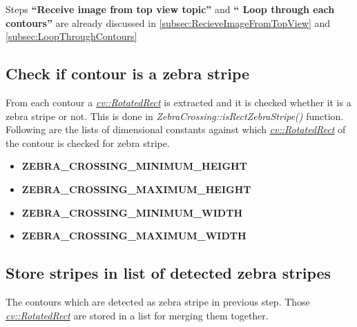 Steps \textbf{``Receive image from top view topic''} and \textbf{`` Loop through each contours''} are already discussed in \autoref{subsec:RecieveImageFromTopView} and \autoref{subsec:LoopThroughContours}

\subsection{Check if contour is a zebra stripe}
\label{sec:ZebraCrossingStripeChecking}
From each contour a \href{https://docs.opencv.org/3.4.3/db/dd6/classcv_1_1RotatedRect.html}{\emph{cv::RotatedRect}} is extracted and it is checked whether it is a zebra stripe or not. This is done in \emph{ZebraCrossing::isRectZebraStripe()} function. Following are the lists of dimensional constants against which \href{https://docs.opencv.org/3.4.3/db/dd6/classcv_1_1RotatedRect.html}{\emph{cv::RotatedRect}} of the contour is checked for zebra stripe.
\begin{itemize}
    \item {\small \textbf{ZEBRA\_CROSSING\_MINIMUM\_HEIGHT}}
    \item {\small \textbf{ZEBRA\_CROSSING\_MAXIMUM\_HEIGHT}}
    \item {\small \textbf{ZEBRA\_CROSSING\_MINIMUM\_WIDTH}}
    \item {\small \textbf{ZEBRA\_CROSSING\_MAXIMUM\_WIDTH}}
\end{itemize}

\subsection{Store stripes in list of detected zebra stripes}
The contours which are detected as zebra stripe in previous step. Those \href{https://docs.opencv.org/3.4.3/db/dd6/classcv_1_1RotatedRect.html}{\emph{cv::RotatedRect}} are stored in a list for merging them together.


